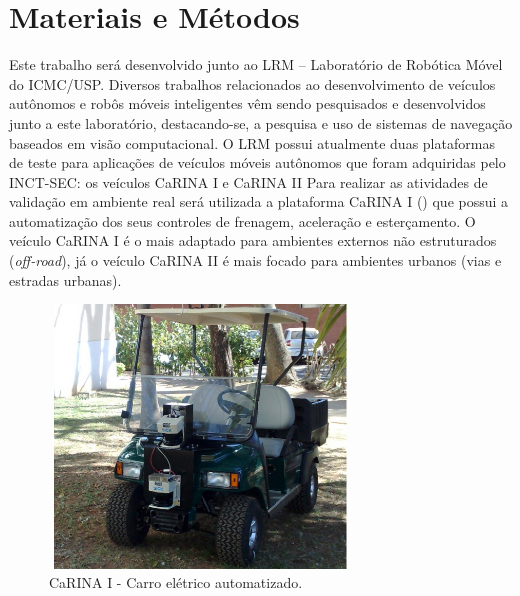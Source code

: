 \section{Materiais e Métodos}

Este trabalho será desenvolvido junto ao LRM – Laboratório de Robótica Móvel
do ICMC/USP. Diversos trabalhos relacionados ao desenvolvimento de veículos
autônomos e robôs móveis inteligentes vêm sendo pesquisados e desenvolvidos
junto a este laboratório, destacando-se, a pesquisa e uso de sistemas de
navegação baseados em visão computacional.
O LRM possui atualmente duas plataformas de teste para aplicações de veículos
móveis autônomos que foram adquiridas pelo INCT-SEC: os veículos CaRINA I e
CaRINA II
Para realizar as atividades de validação em ambiente real será utilizada a
plataforma CaRINA I () que possui a automatização dos seus controles de frenagem,
aceleração e esterçamento. O veículo CaRINA I é o mais adaptado para ambientes
externos não estruturados (\textit{off-road}), já o veículo CaRINA II é mais
focado para ambientes urbanos (vias e estradas urbanas).

\vspace{0.5cm}
\begin{figure}[!h]
  	\centering
	    \includegraphics[width=8cm,height=7cm]{images/carina_1.png}
	 	\caption{CaRINA I - Carro elétrico automatizado.}
	 	\label{fig:carina}
\end{figure}

